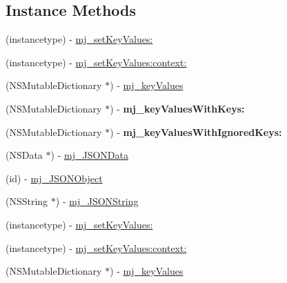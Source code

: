 \subsection*{Instance Methods}
\begin{DoxyCompactItemize}
\item 
(instancetype) -\/ \mbox{\hyperlink{category_n_s_object_07_m_j_key_value_08_a2fc0cfd1fdcccf821c9c2d6552c98fb4}{mj\+\_\+set\+Key\+Values\+:}}
\item 
(instancetype) -\/ \mbox{\hyperlink{category_n_s_object_07_m_j_key_value_08_a78ba4bcf5f9bda89ddb88fcb31fb4053}{mj\+\_\+set\+Key\+Values\+:context\+:}}
\item 
(N\+S\+Mutable\+Dictionary $\ast$) -\/ \mbox{\hyperlink{category_n_s_object_07_m_j_key_value_08_af680df47720adec3697184f8d81044e1}{mj\+\_\+key\+Values}}
\item 
\mbox{\label{category_n_s_object_07_m_j_key_value_08_a429382778a8e55e4b5be5e67b8d57ce5}} 
(N\+S\+Mutable\+Dictionary $\ast$) -\/ {\bfseries mj\+\_\+key\+Values\+With\+Keys\+:}
\item 
\mbox{\label{category_n_s_object_07_m_j_key_value_08_a1e675df8484f47e37f7fdb7df621d5bd}} 
(N\+S\+Mutable\+Dictionary $\ast$) -\/ {\bfseries mj\+\_\+key\+Values\+With\+Ignored\+Keys\+:}
\item 
(N\+S\+Data $\ast$) -\/ \mbox{\hyperlink{category_n_s_object_07_m_j_key_value_08_a063cb2ca185ff6dd4ee655b9e0a07b8e}{mj\+\_\+\+J\+S\+O\+N\+Data}}
\item 
(id) -\/ \mbox{\hyperlink{category_n_s_object_07_m_j_key_value_08_ae6cd431bdbb0349d925f5e223c3ee896}{mj\+\_\+\+J\+S\+O\+N\+Object}}
\item 
(N\+S\+String $\ast$) -\/ \mbox{\hyperlink{category_n_s_object_07_m_j_key_value_08_ad81e02437d4c6c91cedb4673d3f1ecd6}{mj\+\_\+\+J\+S\+O\+N\+String}}
\item 
(instancetype) -\/ \mbox{\hyperlink{category_n_s_object_07_m_j_key_value_08_a2fc0cfd1fdcccf821c9c2d6552c98fb4}{mj\+\_\+set\+Key\+Values\+:}}
\item 
(instancetype) -\/ \mbox{\hyperlink{category_n_s_object_07_m_j_key_value_08_a78ba4bcf5f9bda89ddb88fcb31fb4053}{mj\+\_\+set\+Key\+Values\+:context\+:}}
\item 
(N\+S\+Mutable\+Dictionary $\ast$) -\/ \mbox{\hyperlink{category_n_s_object_07_m_j_key_value_08_af680df47720adec3697184f8d81044e1}{mj\+\_\+key\+Values}}

\end{DoxyCompactItemize}
